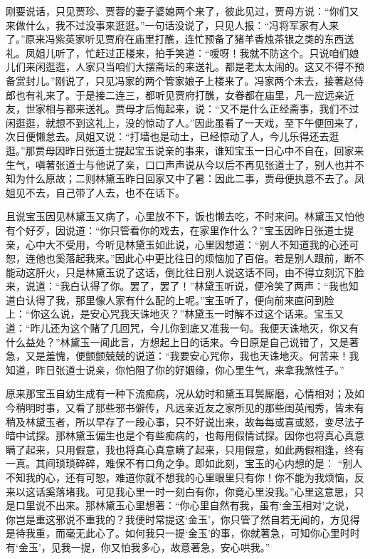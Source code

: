 \begin{parag}


    刚要说话，只见贾珍、贾蓉的妻子婆媳两个来了，彼此见过，贾母方说：“你们又来做什么，我不过没事来逛逛。”一句话没说了，只见人报：“冯将军家有人来了。”原来冯紫英家听见贾府在庙里打醮，连忙预备了猪羊香烛茶银之类的东西送礼。凤姐儿听了，忙赶过正楼来，拍手笑道：“嗳呀！我就不防这个。只说咱们娘儿们来闲逛逛，人家只当咱们大摆斋坛的来送礼。都是老太太闹的。这又不得不预备赏封儿。”刚说了，只见冯家的两个管家娘子上楼来了。冯家两个未去，接著赵侍郎也有礼来了。于是接二连三，都听见贾府打醮，女眷都在庙里，凡一应远亲近友，世家相与都来送礼。贾母才后悔起来，说：“又不是什么正经斋事，我们不过闲逛逛，就想不到这礼上，没的惊动了人。”因此虽看了一天戏，至下午便回来了，次日便懒怠去。凤姐又说：“打墙也是动土，已经惊动了人，今儿乐得还去逛逛。”那贾母因昨日张道士提起宝玉说亲的事来，谁知宝玉一日心中不自在，回家来生气，嗔著张道士与他说了亲，口口声声说从今以后不再见张道士了，别人也并不知为什么原故；二则林黛玉昨日回家又中了暑：因此二事，贾母便执意不去了。凤姐见不去，自己带了人去，也不在话下。
\end{parag}


\begin{parag}


    且说宝玉因见林黛玉又病了，心里放不下，饭也懒去吃，不时来问。林黛玉又怕他有个好歹，因说道：“你只管看你的戏去，在家里作什么？”宝玉因昨日张道士提亲，心中大不受用，今听见林黛玉如此说，心里因想道：“别人不知道我的心还可恕，连他也奚落起我来。”因此心中更比往日的烦恼加了百倍。若是别人跟前，断不能动这肝火，只是林黛玉说了这话，倒比往日别人说这话不同，由不得立刻沉下脸来，说道：“我白认得了你。罢了，罢了！”林黛玉听说，便冷笑了两声：“我也知道白认得了我，那里像人家有什么配的上呢。”宝玉听了，便向前来直问到脸上：“你这么说，是安心咒我天诛地灭？”林黛玉一时解不过这个话来。宝玉又道：“昨儿还为这个赌了几回咒，今儿你到底又准我一句。我便天诛地灭，你又有什么益处？”林黛玉一闻此言，方想起上日的话来。今日原是自己说错了，又是著急，又是羞愧，便颤颤兢兢的说道：“我要安心咒你，我也天诛地灭。何苦来！我知道，昨日张道士说亲，你怕阻了你的好姻缘，你心里生气，来拿我煞性子。”
\end{parag}


\begin{parag}


    原来那宝玉自幼生成有一种下流痴病，况从幼时和黛玉耳鬓厮磨，心情相对；及如今稍明时事，又看了那些邪书僻传，凡远亲近友之家所见的那些闺英闱秀，皆未有稍及林黛玉者，所以早存了一段心事，只不好说出来，故每每或喜或怒，变尽法子暗中试探。那林黛玉偏生也是个有些痴病的，也每用假情试探。因你也将真心真意瞒了起来，只用假意，我也将真心真意瞒了起来，只用假意，如此两假相逢，终有一真。其间琐琐碎碎，难保不有口角之争。即如此刻，宝玉的心内想的是： “别人不知我的心，还有可恕，难道你就不想我的心里眼里只有你！你不能为我烦恼，反来以这话奚落堵我。可见我心里一时一刻白有你，你竟心里没我。”心里这意思，只是口里说不出来。那林黛玉心里想著：“你心里自然有我，虽有‘金玉相对’之说，你岂是重这邪说不重我的？我便时常提这‘金玉’，你只管了然自若无闻的，方见得是待我重，而毫无此心了。如何我只一提‘金玉’的事，你就著急，可知你心里时时有‘金玉’，见我一提，你又怕我多心，故意著急，安心哄我。”
\end{parag}


